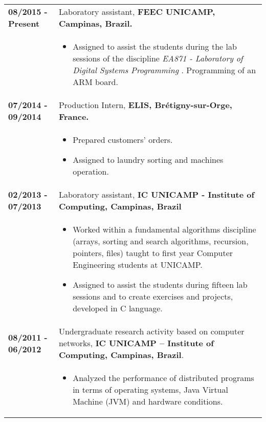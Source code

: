\documentclass[10pt, a4paper]{article}
\begin{document}
\begin{tabular}{p{} p{}}

\textbf{08/2015 - Present}  & Laboratory assistant, \textbf{FEEC
 UNICAMP, Campinas, Brazil.}
 \\
  & \vspace{-12pt}
  \begin{itemize}
    \item Assigned to assist the students during the lab sessions of the
    discipline \textit{EA871 - Laboratory of Digital Systems Programming
    }. Programming of an ARM board.
    
	\end{itemize}\\

 \textbf{07/2014 - 09/2014} & Production Intern, \textbf{ELIS, Brétigny-sur-Orge, France.}\\
  & \vspace{-12pt}  
  \begin{itemize}
    \item Prepared customers' orders.
    \item Assigned to laundry sorting and machines operation.
  \end{itemize} \\


 \textbf{02/2013 - 07/2013}   & Laboratory assistant, \textbf{IC UNICAMP -
 Institute of Computing, Campinas, Brazil} \\
 & \vspace{-12pt} 
	 \begin {itemize} 
	   	\item Worked within a fundamental algorithms discipline (arrays, sorting and search algorithms, recursion, pointers, files)
	 taught to first year Computer Engineering students at UNICAMP.
	 
	 	\item Assigned to assist the students during fifteen lab sessions and to
	 create exercises and projects, developed in C language.
	 \end{itemize} \\

 \textbf{08/2011 - 06/2012} & Undergraduate research activity based on computer
 networks, \textbf{IC UNICAMP – Institute of Computing, Campinas, Brazil}.   \\
 & 
 	\vspace{-12pt}
	\begin{itemize}
   	\item Analyzed the performance of distributed programs in terms of
 		operating systems, Java Virtual Machine (JVM) and hardware conditions.
 	\end{itemize} \\
 

\end{tabular}
\end{document}
